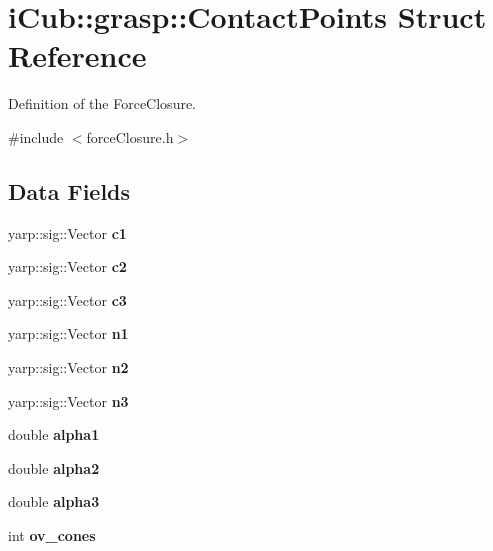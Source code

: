\section{i\+Cub\+:\+:grasp\+:\+:Contact\+Points Struct Reference}
\label{structiCub_1_1grasp_1_1ContactPoints}


Definition of the Force\+Closure.  




{\ttfamily \#include $<$force\+Closure.\+h$>$}

\subsection*{Data Fields}
\begin{DoxyCompactItemize}
\item 
yarp\+::sig\+::\+Vector {\bfseries c1}\label{structiCub_1_1grasp_1_1ContactPoints_aa6ce776737a5b4b31843fe207068ae6f}

\item 
yarp\+::sig\+::\+Vector {\bfseries c2}\label{structiCub_1_1grasp_1_1ContactPoints_ae99dea754916c00b09ce7b5363724b51}

\item 
yarp\+::sig\+::\+Vector {\bfseries c3}\label{structiCub_1_1grasp_1_1ContactPoints_ae781f84ef5e47006ac055b439939c22a}

\item 
yarp\+::sig\+::\+Vector {\bfseries n1}\label{structiCub_1_1grasp_1_1ContactPoints_a2da07ce7a54c3bcda2968aefbaddd6ca}

\item 
yarp\+::sig\+::\+Vector {\bfseries n2}\label{structiCub_1_1grasp_1_1ContactPoints_a1fb1b04a6fa25f1d480e3cdb770d23d7}

\item 
yarp\+::sig\+::\+Vector {\bfseries n3}\label{structiCub_1_1grasp_1_1ContactPoints_a5271cce9c612d6cb1a91ee91be2ab945}

\item 
double {\bfseries alpha1}\label{structiCub_1_1grasp_1_1ContactPoints_aa178bc34a5b13366a2b23b9345543023}

\item 
double {\bfseries alpha2}\label{structiCub_1_1grasp_1_1ContactPoints_a49b5e34d24c83e7107b24462121ee133}

\item 
double {\bfseries alpha3}\label{structiCub_1_1grasp_1_1ContactPoints_a49e2797c4be9fca7d15114c5f3a85e4c}

\item 
int {\bfseries ov\+\_\+cones}\label{structiCub_1_1grasp_1_1ContactPoints_a8c4a117cf0b4729257df2826f2c5ac2d}

\end{DoxyCompactItemize}


